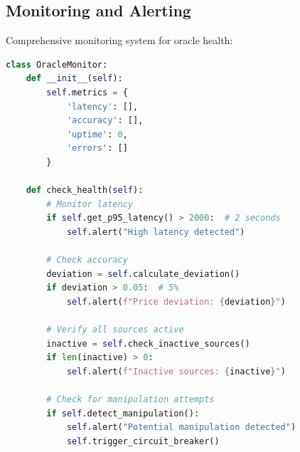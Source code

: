 \subsection{Monitoring and Alerting}

Comprehensive monitoring system for oracle health:

\begin{lstlisting}[language=Python, caption={Oracle Monitoring System}]
class OracleMonitor:
    def __init__(self):
        self.metrics = {
            'latency': [],
            'accuracy': [],
            'uptime': 0,
            'errors': []
        }
    
    def check_health(self):
        # Monitor latency
        if self.get_p95_latency() > 2000:  # 2 seconds
            self.alert("High latency detected")
        
        # Check accuracy
        deviation = self.calculate_deviation()
        if deviation > 0.05:  # 5%
            self.alert(f"Price deviation: {deviation}")
        
        # Verify all sources active
        inactive = self.check_inactive_sources()
        if len(inactive) > 0:
            self.alert(f"Inactive sources: {inactive}")
        
        # Check for manipulation attempts
        if self.detect_manipulation():
            self.alert("Potential manipulation detected")
            self.trigger_circuit_breaker()
\end{lstlisting}

